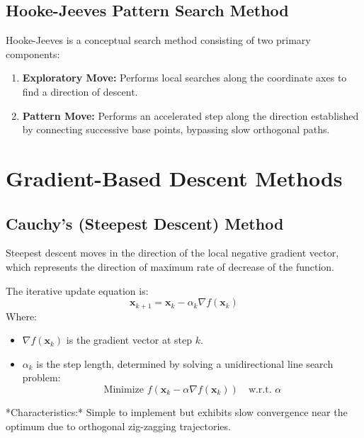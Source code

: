 \documentclass[12pt,a4paper]{article}
\begin{document}
\subsection{Hooke-Jeeves Pattern Search Method}
Hooke-Jeeves is a conceptual search method consisting of two primary components:
\begin{enumerate}[label=\textbf{\arabic*.}, leftmargin=*, itemsep=2.5pt]
  \item \textbf{Exploratory Move:} Performs local searches along the coordinate axes to find a direction of descent.
  \item \textbf{Pattern Move:} Performs an accelerated step along the direction established by connecting successive base points, bypassing slow orthogonal paths.
\end{enumerate}

\section{Gradient-Based Descent Methods}

\subsection{Cauchy's (Steepest Descent) Method}
Steepest descent moves in the direction of the local negative gradient vector, which represents the direction of maximum rate of decrease of the function.

\begin{tcolorbox}[formulabox, title={Steepest Descent Formulation}]
The iterative update equation is:
\begin{equation}
  \mathbf{x}_{k+1} = \mathbf{x}_k - \alpha_k \nabla f(\mathbf{x}_k)
\end{equation}
Where:
\begin{itemize}[leftmargin=*, itemsep=2pt, topsep=0pt]
  \item $\nabla f(\mathbf{x}_k)$ is the gradient vector at step $k$.
  \item $\alpha_k$ is the step length, determined by solving a unidirectional line search problem:
    \begin{equation}
      \text{Minimize } f(\mathbf{x}_k - \alpha \nabla f(\mathbf{x}_k)) \quad \text{w.r.t. } \alpha
    \end{equation}
\end{itemize}
*Characteristics:* Simple to implement but exhibits slow convergence near the optimum due to orthogonal zig-zagging trajectories.
\end{tcolorbox}
\end{document}
